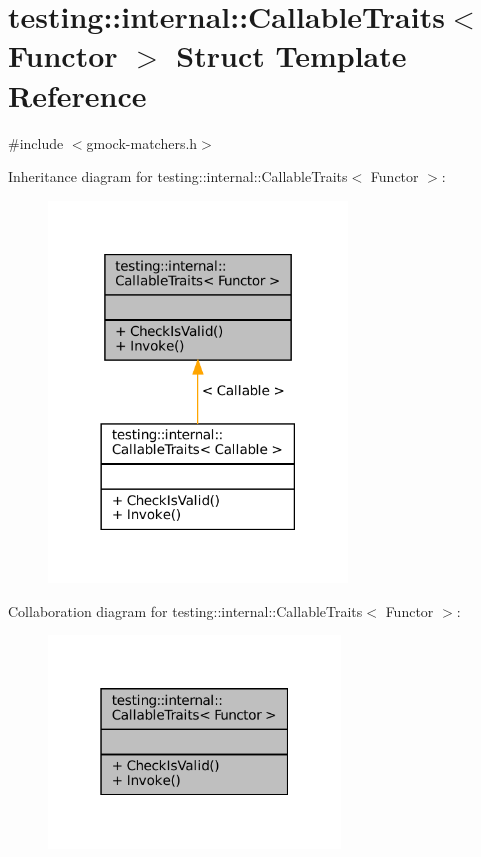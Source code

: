 \hypertarget{structtesting_1_1internal_1_1CallableTraits}{}\section{testing\+:\+:internal\+:\+:Callable\+Traits$<$ Functor $>$ Struct Template Reference}
\label{structtesting_1_1internal_1_1CallableTraits}


{\ttfamily \#include $<$gmock-\/matchers.\+h$>$}



Inheritance diagram for testing\+:\+:internal\+:\+:Callable\+Traits$<$ Functor $>$\+:
\nopagebreak
\begin{figure}[H]
\begin{center}
\leavevmode
\includegraphics[width=225pt]{structtesting_1_1internal_1_1CallableTraits__inherit__graph}
\end{center}
\end{figure}


Collaboration diagram for testing\+:\+:internal\+:\+:Callable\+Traits$<$ Functor $>$\+:
\nopagebreak
\begin{figure}[H]
\begin{center}
\leavevmode
\includegraphics[width=220pt]{structtesting_1_1internal_1_1CallableTraits__coll__graph}
\end{center}
\end{figure}
